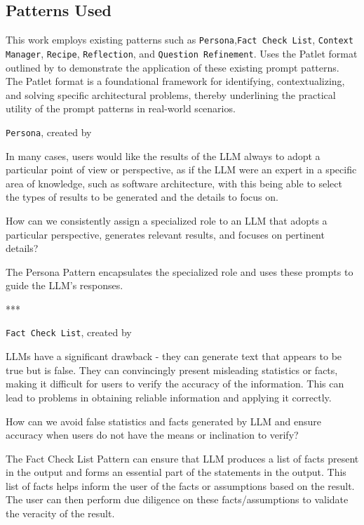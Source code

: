 \subsection{Patterns Used}\label{patterns-used}
This work employs existing patterns such as \texttt{Persona},\texttt{Fact Check List}, \texttt{Context Manager}, \texttt{Recipe}, \texttt{Reflection}, and \texttt{Question Refinement}. Uses the Patlet format  outlined by \textcite{buschmann2007pattern} to demonstrate the application of these existing prompt patterns. The Patlet format is a foundational framework for identifying, contextualizing, and solving specific architectural problems, thereby underlining the practical utility of the prompt patterns in real-world scenarios.


\texttt{Persona}, created by \textcite{white2023prompt}

 In many cases, users would like the results of the LLM always to adopt a particular point of view or perspective, as if the LLM were an expert in a specific area of knowledge, such as software architecture, with this being able to select the types of results to be generated and the details to focus on.

 How can we consistently assign a specialized role to an LLM that adopts a particular perspective, generates relevant results, and focuses on pertinent details?

 The Persona Pattern encapsulates the specialized role and uses these prompts to guide the LLM's responses.

\begin{center}
***
\end{center}

\texttt{Fact Check List}, created by \textcite{white2023prompt}

 LLMs have a significant drawback - they can generate text that appears to be true but is false. They can convincingly present misleading statistics or facts, making it difficult for users to verify the accuracy of the information. This can lead to problems in obtaining reliable information and applying it correctly.

 How can we avoid false statistics and facts generated by LLM and ensure accuracy when users do not have the means or inclination to verify?

 The Fact Check List Pattern can ensure that LLM produces a list of facts present in the output and forms an essential part of the statements in the output. This list of facts helps inform the user of the facts or assumptions based on the result. The user can then perform due diligence on these facts/assumptions to validate the veracity of the result.

